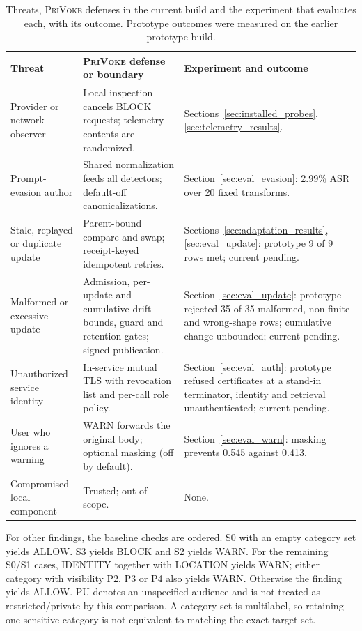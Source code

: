 \documentclass[sigconf]{acmart}
\theoremstyle{acmdefinition}\newtheorem{property}{Property}
\newcommand{\privoke}{\textsc{PriVoke}\xspace}
\newcommand{\pendingStageThirteen}[1]{#1}
\begin{document}
\begin{table}[!t]
\centering
\caption{Threats, \privoke defenses in the current build and the experiment that evaluates each, with its outcome. Prototype outcomes were measured on the earlier prototype build.}
\label{tab:threat_defense}
\small
\begin{tabular}{p{}p{}p{}}
\toprule
Threat & \privoke defense or boundary & Experiment and outcome \\
\midrule
Provider or network observer & Local inspection cancels BLOCK requests; telemetry contents are randomized. & Sections~\ref{sec:installed_probes}, \ref{sec:telemetry_results}. \\
Prompt-evasion author & Shared normalization feeds all detectors; default-off canonicalizations. & Section~\ref{sec:eval_evasion}: 2.99\% ASR over 20 fixed transforms. \\
Stale, replayed or duplicate update & Parent-bound compare-and-swap; receipt-keyed idempotent retries. & Sections~\ref{sec:adaptation_results}, \ref{sec:eval_update}: prototype 9 of 9 rows met; \pendingStageThirteen{current pending}. \\
Malformed or excessive update & Admission, per-update and cumulative drift bounds, guard and retention gates; signed publication. & Section~\ref{sec:eval_update}: prototype rejected 35 of 35 malformed, non-finite and wrong-shape rows; cumulative change unbounded; \pendingStageThirteen{current pending}. \\
Unauthorized service identity & In-service mutual TLS with revocation list and per-call role policy. & Section~\ref{sec:eval_auth}: prototype refused certificates at a stand-in terminator, identity and retrieval unauthenticated; \pendingStageThirteen{current pending}. \\
User who ignores a warning & WARN forwards the original body; optional masking (off by default). & Section~\ref{sec:eval_warn}: masking prevents 0.545 against 0.413. \\
Compromised local component & Trusted; out of scope. & None. \\
\bottomrule
\end{tabular}
\end{table}

For other findings, the baseline checks are ordered. S0 with an empty category set yields ALLOW. S3 yields BLOCK and S2 yields WARN. For the remaining S0/S1 cases, IDENTITY together with LOCATION yields WARN; either category with visibility P2, P3 or P4 also yields WARN. Otherwise the finding yields ALLOW. PU denotes an unspecified audience and is not treated as restricted/private by this comparison. A category set is multilabel, so retaining one sensitive category is not equivalent to matching the exact target set.
\end{document}
